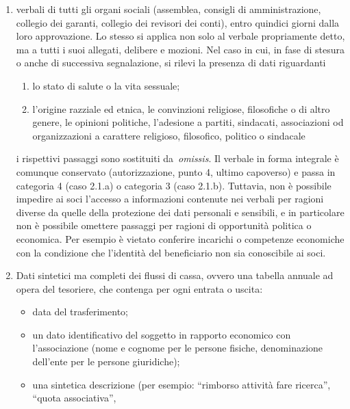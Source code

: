 \begin{enumerate}
    \item
        verbali di tutti gli organi sociali (assemblea, consigli di
        amministrazione, collegio dei garanti, collegio dei revisori dei
        conti), entro quindici giorni dalla loro approvazione. Lo stesso si
        applica non solo al verbale propriamente detto, ma a tutti i suoi
        allegati, delibere e mozioni. Nel caso in cui, in fase di stesura
        o anche di successiva segnalazione, si rilevi la presenza di dati
        riguardanti
        \begin{enumerate}
            \item lo stato di salute o la vita sessuale;
            \item l'origine razziale ed etnica, le
                convinzioni religiose, filosofiche o di altro genere, le opinioni
                politiche, l'adesione a partiti, sindacati, associazioni od
                organizzazioni a carattere religioso, filosofico, politico o
                sindacale
        \end{enumerate}
        i rispettivi passaggi sono sostituiti da~\emph{omissis}. Il verbale in
        forma integrale è comunque conservato (autorizzazione, punto 4, ultimo
        capoverso) e passa in categoria 4 (caso 2.1.a) o categoria 3 (caso
        2.1.b). Tuttavia, non è possibile impedire ai soci l'accesso a
        informazioni contenute nei verbali per ragioni diverse da quelle
        della protezione dei dati personali e sensibili, e in particolare non è
        possibile omettere passaggi per ragioni di opportunità politica o
        economica. Per esempio è vietato conferire incarichi o competenze
        economiche con la condizione che l'identità del beneficiario non sia
        conoscibile ai soci.
    \item
        Dati sintetici ma completi dei flussi di cassa, ovvero una tabella
        annuale ad opera del tesoriere, che contenga per ogni entrata o uscita:
        \begin{itemize}
            \item data del trasferimento;
            \item un dato identificativo del soggetto in rapporto economico
                con l'associazione (nome e cognome per le persone fisiche,
                denominazione dell'ente per le persone giuridiche);
            \item una sintetica descrizione (per esempio: ``rimborso
                attività fare ricerca'', ``quota associativa'',

\end{itemize}
\end{enumerate}
